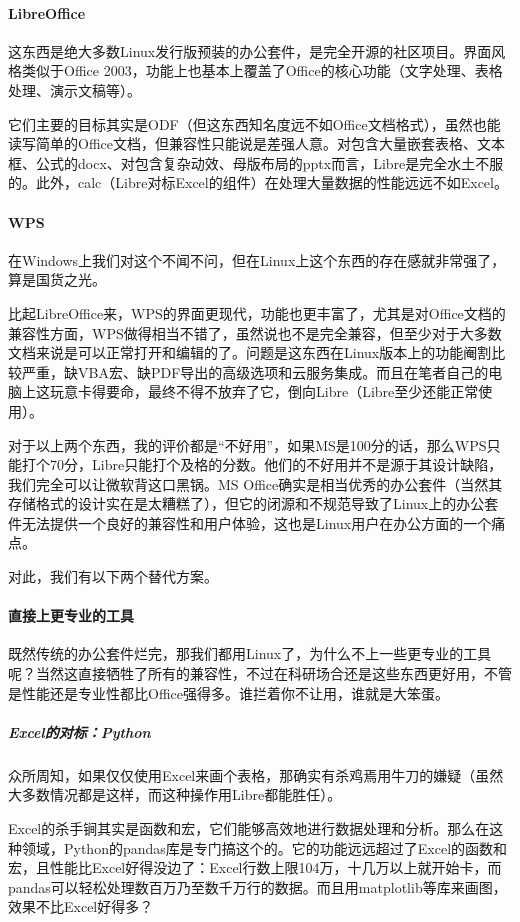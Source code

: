 \paragraph{LibreOffice} 这东西是绝大多数Linux发行版预装的办公套件，是完全开源的社区项目。界面风格类似于Office 2003，功能上也基本上覆盖了Office的核心功能（文字处理、表格处理、演示文稿等）。

它们主要的目标其实是ODF（但这东西知名度远不如Office文档格式），虽然也能读写简单的Office文档，但兼容性只能说是差强人意。对包含大量嵌套表格、文本框、公式的docx、对包含复杂动效、母版布局的pptx而言，Libre是完全水土不服的。此外，calc（Libre对标Excel的组件）在处理大量数据的性能远远不如Excel。

\paragraph{WPS} 在Windows上我们对这个不闻不问，但在Linux上这个东西的存在感就非常强了，算是国货之光。

比起LibreOffice来，WPS的界面更现代，功能也更丰富了，尤其是对Office文档的兼容性方面，WPS做得相当不错了，虽然说也不是完全兼容，但至少对于大多数文档来说是可以正常打开和编辑的了。问题是这东西在Linux版本上的功能阉割比较严重，缺VBA宏、缺PDF导出的高级选项和云服务集成。而且在笔者自己的电脑上这玩意卡得要命，最终不得不放弃了它，倒向Libre（Libre至少还能正常使用）。

对于以上两个东西，我的评价都是“不好用”，如果MS是100分的话，那么WPS只能打个70分，Libre只能打个及格的分数。他们的不好用并不是源于其设计缺陷，我们完全可以让微软背这口黑锅。MS Office确实是相当优秀的办公套件（当然其存储格式的设计实在是太糟糕了），但它的闭源和不规范导致了Linux上的办公套件无法提供一个良好的兼容性和用户体验，这也是Linux用户在办公方面的一个痛点。

对此，我们有以下两个替代方案。
\paragraph{直接上更专业的工具} 既然传统的办公套件烂完，那我们都用Linux了，为什么不上一些更专业的工具呢？当然这直接牺牲了所有的兼容性，不过在科研场合还是这些东西更好用，不管是性能还是专业性都比Office强得多。谁拦着你不让用，谁就是大笨蛋。

\subparagraph{Excel的对标：Python} 众所周知，如果仅仅使用Excel来画个表格，那确实有杀鸡焉用牛刀的嫌疑（虽然大多数情况都是这样，而这种操作用Libre都能胜任）。

Excel的杀手锏其实是函数和宏，它们能够高效地进行数据处理和分析。那么在这种领域，Python的pandas库是专门搞这个的。它的功能远远超过了Excel的函数和宏，且性能比Excel好得没边了：Excel行数上限104万，十几万以上就开始卡，而pandas可以轻松处理数百万乃至数千万行的数据。而且用matplotlib等库来画图，效果不比Excel好得多？

